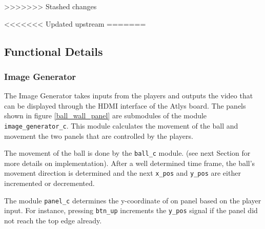 	
	
>>>>>>> Stashed changes
		
		
<<<<<<< Updated upstream
=======

	\newpage	
	\subsection{Functional Details}
		\subsubsection{Image Generator}
		The Image Generator takes inputs from the players and outputs the video that can be displayed through the HDMI interface of the Atlys board. The panels shown in figure \ref{ball_wall_panel} are submodules of the module \texttt{image\_generator\_c}.
		This module calculates the movement of the ball and movement the two panels that are controlled by the players. 
		
		The movement of the ball is done by the \texttt{ball\_c} module. (see next Section for more details on implementation).
		After a well determined time frame, the ball's movement direction is determined and the next \texttt{x\_pos} and \texttt{y\_pos} are either incremented or decremented. 
		
		The module \texttt{panel\_c} determines the y-coordinate of on panel based on the player input. For instance, pressing \texttt{btn\_up} increments the \texttt{y\_pos} signal if the panel did not reach the top edge already. 


